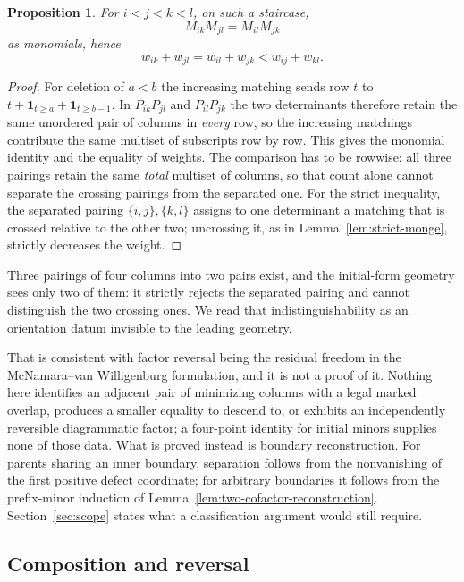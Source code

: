 \documentclass[11pt,a4paper]{amsart}
\numberwithin{equation}{section}
\theoremstyle{plain}
\newtheorem{proposition}[theorem]{Proposition}
\theoremstyle{definition}
\begin{document}
\begin{proposition}\label{prop:caterpillar}
For \(i<j<k<l\), on such a staircase,
\[
M_{ik}M_{jl}=M_{il}M_{jk}
\]
as monomials, hence
\[
w_{ik}+w_{jl}=w_{il}+w_{jk}
<
w_{ij}+w_{kl}.
\]
\end{proposition}

\begin{proof}
For deletion of \(a<b\) the increasing matching sends row \(t\) to \(t+\mathbf1_{t\ge a}+\mathbf1_{t\ge b-1}\).  In \(P_{ik}P_{jl}\) and \(P_{il}P_{jk}\) the two determinants therefore retain the same unordered pair of columns in \emph{every} row, so the increasing matchings contribute the same multiset of subscripts row by row.  This gives the monomial identity and the equality of weights.  The comparison has to be rowwise: all three pairings retain the same \emph{total} multiset of columns, so that count alone cannot separate the crossing pairings from the separated one.  For the strict inequality, the separated pairing \(\{i,j\},\{k,l\}\) assigns to one determinant a matching that is crossed relative to the other two; uncrossing it, as in Lemma~\ref{lem:strict-monge}, strictly decreases the weight.
\end{proof}

Three pairings of four columns into two pairs exist, and the initial-form
geometry sees only two of them: it strictly rejects the separated pairing
and cannot distinguish the two crossing ones.  We read that
indistinguishability as an orientation datum invisible to the leading
geometry.

That is consistent with factor reversal being the residual freedom in the
McNamara--van Willigenburg formulation, and it is not a proof of it.
Nothing here identifies an adjacent pair of minimizing columns with a legal
marked overlap, produces a smaller equality to descend to, or exhibits an
independently reversible diagrammatic factor; a four-point identity for
initial minors supplies none of those data.  What is proved instead is
boundary reconstruction.  For parents sharing an inner boundary, separation
follows from the nonvanishing of the first positive defect coordinate; for
arbitrary boundaries it follows from the prefix-minor induction of
Lemma~\ref{lem:two-cofactor-reconstruction}.  Section~\ref{sec:scope} states what a
classification argument would still require.

\subsection{Composition and reversal}
\end{document}
